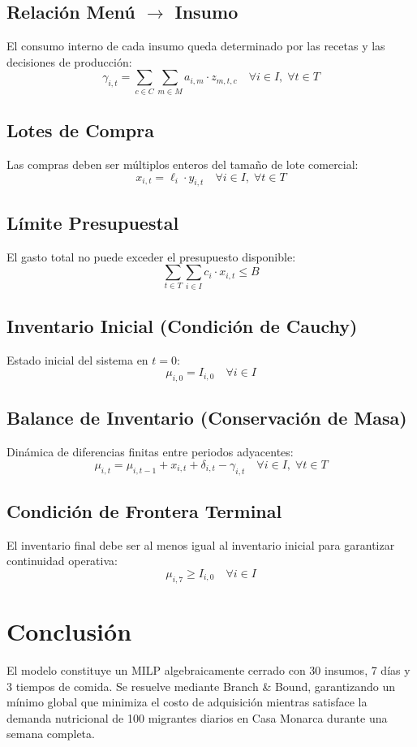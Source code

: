 \documentclass[12pt, letterpaper]{article}
\begin{document}
\subsection{Relación Menú $\to$ Insumo}
El consumo interno de cada insumo queda determinado por las recetas y las decisiones de producción:
\[
  \gamma_{i,t} = \sum_{c \in C} \sum_{m \in M} a_{i,m} \cdot z_{m,t,c} \quad \forall i \in I,\; \forall t \in T \tag{10}
\]

\subsection{Lotes de Compra}
Las compras deben ser múltiplos enteros del tamaño de lote comercial:
\[
  x_{i,t} = \ell_i \cdot y_{i,t} \quad \forall i \in I,\; \forall t \in T \tag{11}
\]

\subsection{Límite Presupuestal}
El gasto total no puede exceder el presupuesto disponible:
\[
  \sum_{t \in T} \sum_{i \in I} c_i \cdot x_{i,t} \leq B \tag{12}
\]

\subsection{Inventario Inicial (Condición de Cauchy)}
Estado inicial del sistema en $t = 0$:
\[
  \mu_{i,0} = I_{i,0} \quad \forall i \in I \tag{13}
\]

\subsection{Balance de Inventario (Conservación de Masa)}
Dinámica de diferencias finitas entre periodos adyacentes:
\[
  \mu_{i,t} = \mu_{i,t-1} + x_{i,t} + \delta_{i,t} - \gamma_{i,t} \quad \forall i \in I,\; \forall t \in T \tag{14}
\]

\subsection{Condición de Frontera Terminal}
El inventario final debe ser al menos igual al inventario inicial para garantizar continuidad operativa:
\[
  \mu_{i,7} \geq I_{i,0} \quad \forall i \in I \tag{15}
\]

\section*{Conclusión}

El modelo constituye un MILP algebraicamente cerrado con 30 insumos, 7 días y 3 tiempos de comida. Se resuelve mediante Branch \& Bound, garantizando un mínimo global que minimiza el costo de adquisición mientras satisface la demanda nutricional de 100 migrantes diarios en Casa Monarca durante una semana completa.
\end{document}
